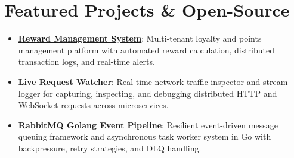 \section{Featured Projects \& Open-Source}
\begin{itemize}
  \item \href{https://github.com/lakshay88/reward-management-system}{\textbf{Reward Management System}}: Multi-tenant loyalty and points management platform with automated reward calculation, distributed transaction logs, and real-time alerts.
  \item \href{https://github.com/lakshay88/live-request-watcher}{\textbf{Live Request Watcher}}: Real-time network traffic inspector and stream logger for capturing, inspecting, and debugging distributed HTTP and WebSocket requests across microservices.
  \item \href{https://github.com/lakshay88/rabbitmq-golang}{\textbf{RabbitMQ Golang Event Pipeline}}: Resilient event-driven message queuing framework and asynchronous task worker system in Go with backpressure, retry strategies, and DLQ handling.
\end{itemize}
